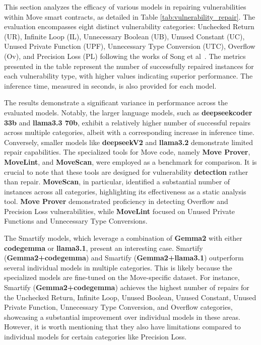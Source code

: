 This section analyzes the efficacy of various models in repairing vulnerabilities within Move smart contracts, as detailed in Table \ref{tab:vulnerability_repair}. The evaluation encompasses eight distinct vulnerability categories: Unchecked Return (UR), Infinite Loop (IL), Unnecessary Boolean (UB), Unused Constant (UC), Unused Private Function (UPF), Unnecessary Type Conversion (UTC), Overflow (Ov), and Precision Loss (PL) following the works of Song et al~\cite{song2024empirical}. The metrics presented in the table represent the number of successfully repaired instances for each vulnerability type, with higher values indicating superior performance. The inference time, measured in seconds, is also provided for each model.

The results demonstrate a significant variance in performance across the evaluated models. Notably, the larger language models, such as \textbf{deepseekcoder 33b} and \textbf{llama3.3 70b}, exhibit a relatively higher number of successful repairs across multiple categories, albeit with a corresponding increase in inference time. Conversely, smaller models like \textbf{deepseekV2} and \textbf{llama3.2} demonstrate limited repair capabilities.  The specialized tools for Move code, namely \textbf{Move Prover}, \textbf{MoveLint}, and \textbf{MoveScan}, were employed as a benchmark for comparison. It is crucial to note that these tools are designed for vulnerability \textbf{detection} rather than repair. \textbf{MoveScan}, in particular, identified a substantial number of instances across all categories, highlighting its effectiveness as a static analysis tool. \textbf{Move Prover} demonstrated proficiency in detecting Overflow and Precision Loss vulnerabilities, while \textbf{MoveLint} focused on Unused Private Functions and Unnecessary Type Conversions.

The Smartify models, which leverage a combination of \textbf{Gemma2} with either \textbf{codegemma} or \textbf{llama3.1}, present an interesting case. Smartify (\textbf{Gemma2+codegemma}) and Smartify (\textbf{Gemma2+llama3.1}) outperform several individual models in multiple categories. This is likely because the specialized models are fine-tuned on the Move-specific dataset. For instance, Smartify (\textbf{Gemma2+codegemma}) achieves the highest number of repairs for the Unchecked Return, Infinite Loop, Unused Boolean, Unused Constant, Unused Private Function, Unnecessary Type Conversion, and Overflow categories, showcasing a substantial improvement over individual models in these areas. However, it is worth mentioning that they also have limitations compared to individual models for certain categories like Precision Loss.

